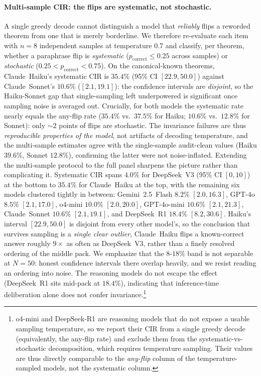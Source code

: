 \documentclass{article}
\begin{document}
\paragraph{Multi-sample CIR: the flips are systematic, not stochastic.}
A single greedy decode cannot distinguish a model that \emph{reliably} flips a reworded theorem from one that is merely borderline. We therefore re-evaluate each item with $n{=}8$ independent samples at temperature $0.7$ and classify, per theorem, whether a paraphrase flip is \emph{systematic} ($p_{\text{correct}}\le0.25$ across samples) or \emph{stochastic} ($0.25<p_{\text{correct}}<0.75$). On the canonical-known theorems, Claude~Haiku's systematic CIR is $35.4\%$ (95\% CI $[22.9,50.0]$) against Claude~Sonnet's $10.6\%$ ($[2.1,19.1]$): the confidence intervals are \emph{disjoint}, so the Haiku-Sonnet gap that single-sampling left underpowered is significant once sampling noise is averaged out. Crucially, for both models the systematic rate nearly equals the any-flip rate ($35.4\%$ vs.\ $37.5\%$ for Haiku; $10.6\%$ vs.\ $12.8\%$ for Sonnet): only ${\sim}2$ points of flips are stochastic. The invariance failures are thus \emph{reproducible properties of the model}, not artifacts of decoding temperature, and the multi-sample estimates agree with the single-sample audit-clean values (Haiku $39.6\%$, Sonnet $12.8\%$), confirming the latter were not noise-inflated. Extending the multi-sample protocol to the full panel sharpens the picture rather than complicating it. Systematic CIR spans $4.0\%$ for DeepSeek~V3 (95\% CI $[0,10]$) at the bottom to $35.4\%$ for Claude~Haiku at the top, with the remaining six models clustered tightly in between: Gemini~2.5~Flash $8.2\%$ $[2.0,16.3]$, GPT-4o $8.5\%$ $[2.1,17.0]$, o4-mini $10.0\%$ $[2.0,20.0]$, GPT-4o-mini $10.6\%$ $[2.1,21.3]$, Claude~Sonnet $10.6\%$ $[2.1,19.1]$, and DeepSeek~R1 $18.4\%$ $[8.2,30.6]$. Haiku's interval $[22.9,50.0]$ is disjoint from every other model's, so the conclusion that survives sampling is a \emph{single clear outlier}, Claude~Haiku flips a known-correct answer roughly $9\times$ as often as DeepSeek~V3, rather than a finely resolved ordering of the middle pack. We emphasize that the $8$-$18\%$ band is not separable at $N{=}50$: honest confidence intervals there overlap heavily, and we resist reading an ordering into noise. The reasoning models do not escape the effect (DeepSeek~R1 sits mid-pack at $18.4\%$), indicating that inference-time deliberation alone does not confer invariance.\footnote{o4-mini and DeepSeek-R1 are reasoning models that do not expose a usable sampling temperature, so we report their CIR from a single greedy decode (equivalently, the any-flip rate) and exclude them from the systematic-vs-stochastic decomposition, which requires temperature sampling. Their values are thus directly comparable to the \emph{any-flip} column of the temperature-sampled models, not the systematic column.}
\end{document}
